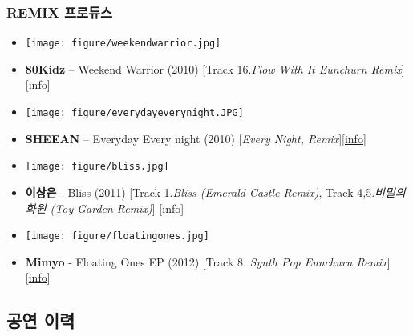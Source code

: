 \subsubsection{REMIX 프로듀스}
\begin{itemize}
\item \texttt{[image: figure/weekendwarrior.jpg]}
\item \textbf{80Kidz} – Weekend Warrior (2010) [Track 16.\textit{Flow With It Eunchurn Remix}][\href{http://www.eunchurn.com/2010/12/01/80kidz-weekend-warrior-dropping-out/}{\footnotesize{info}}]
\item \texttt{[image: figure/everydayeverynight.JPG]}
\item \textbf{SHEEAN} – Everyday Every night (2010) [\textit{Every Night, Remix}][\href{http://music.naver.com/album/index.nhn?albumId=186008&trackId=2348557}{\footnotesize{info}}]
\item \texttt{[image: figure/bliss.jpg]}
\item \textbf{이상은} - Bliss (2011) [Track 1.\textit{Bliss (Emerald Castle Remix)}, Track 4,5.\textit{비밀의 화원 (Toy Garden Remix)}] [\href{http://www.eunchurn.com/2011/08/15/leetzsche-bliss-digital-single-2011/}{\footnotesize{info}}]
\item \texttt{[image: figure/floatingones.jpg]}
\item \textbf{Mimyo} - Floating Ones EP (2012) [Track 8. \textit{Synth Pop Eunchurn Remix}][\href{http://www.eunchurn.com/2012/06/24/mimyo-floating-ones-ep-2012/}{\footnotesize{info}}]
\end{itemize}

\subsection{공연 이력}
